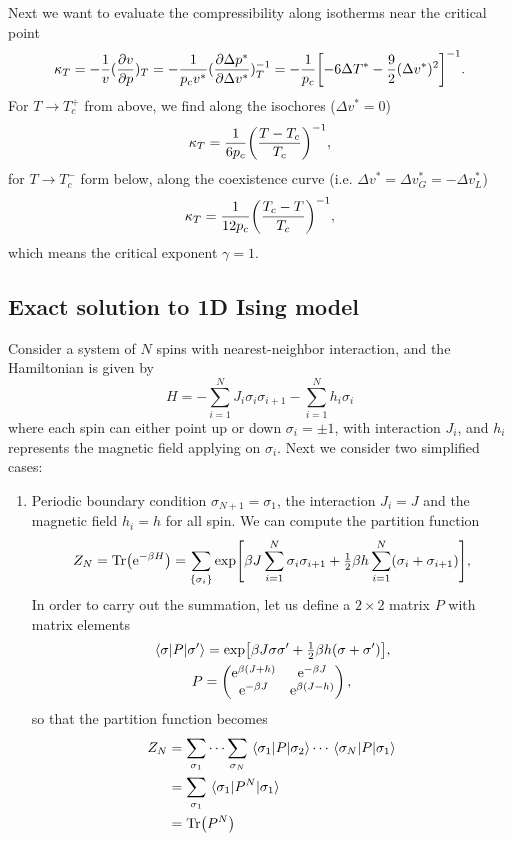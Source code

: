\documentclass[10pt]{article}
\begin{document}
	Next we want to evaluate the compressibility along isotherms near the critical point
	\begin{equation}
		\kappa_T = -\frac{1}{v} (\pdv{v}{p})_T = - \frac{1}{p_c v^*} (\pdv{\Delta p^*}{\Delta v^*})^{-1}_T = -\frac{1}{p_c}\qty[-6 \Delta T^* - \frac{9}{2}(\Delta v^*)^2]^{-1}.
	\end{equation}
	For $T \to T_c^+$ from above, we find along the isochores ($\Delta v^* = 0$)
	\begin{equation}
		\kappa_T = \frac{1}{6 p_c} \qty(\frac{T-T_c}{T_c})^{-1},
	\end{equation}
	for $T \to T_c^-$ form below, along the coexistence curve (i.e. $\Delta v^* = \Delta v^*_{G} = -\Delta v^*_{L}$)
	\begin{equation}
		\kappa_T = \frac{1}{12 p_c} \qty(\frac{T_c-T}{T_c})^{-1},
	\end{equation}
	which means the critical exponent $\gamma = 1$.

	\subsection{Exact solution to 1D Ising model}

	Consider a system of $N$ spins with nearest-neighbor interaction, and the Hamiltonian is given by
	\begin{equation}
		H = - \sum_{i=1}^{N} J_i \sigma_i \sigma_{i+1} - \sum_{i=1}^{N} h_i \sigma_i
	\end{equation}
	where each spin can either point up or down $\sigma_i = \pm 1$, with interaction $J_i$, and $h_i$ represents the magnetic field applying on $\sigma_i$.
	Next we consider two simplified cases:
	\begin{enumerate}
		\item Periodic boundary condition $\sigma_{N+1} = \sigma_1$, the interaction $J_i = J$ and the magnetic field $h_i = h$ for all spin. We can compute the partition function
		\begin{equation}
			Z_N = \Tr({\mathrm{e}}^{-\beta H}) = \sum_{\{\sigma_i\}} \exp[\beta J \sum_{i=1}^{N} \sigma_i \sigma_{i+1} + \tfrac{1}{2} \beta h \sum_{i=1}^{N} (\sigma_i + \sigma_{i+1})],
		\end{equation}
		In order to carry out the summation, let us define a $2 \times 2$ matrix $P$ with matrix elements
		\begin{gather}
			\mel{\sigma}{P}{\sigma'} = \exp[\beta J \sigma \sigma' + \thalf \beta h (\sigma + \sigma')], \\
			P = \pmqty{{\e}^{\beta(J+h)} & {\e}^{-\beta J} \\ {\e}^{-\beta J} & {\e}^{\beta(J-h)}},
		\end{gather}
		so that the partition function becomes
		\begin{align*}
			Z_N &= \sum_{\sigma_1} \cdots \sum_{\sigma_N} \mel{\sigma_1}{P}{\sigma_2} \cdots \mel{\sigma_{N}}{P}{\sigma_1} \\
			&= \sum_{\sigma_1} \mel{\sigma_1}{P^N}{\sigma_1} \\
			&= \Tr(P^N)
		\end{align*}
	\end{enumerate}
\end{document}
